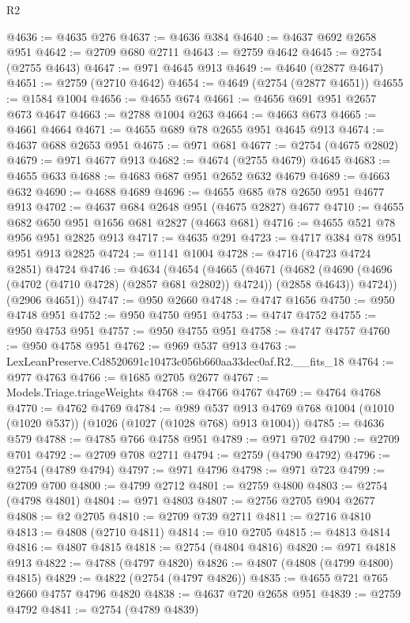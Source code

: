 \begin{lexlean}{R2}
\begin{coremodule}
@4636 := @4635 @276
@4637 := @4636 @384
@4640 := @4637 @692 @2658 @951
@4642 := @2709 @680 @2711
@4643 := @2759 @4642
@4645 := @2754 (@2755 @4643)
@4647 := @971 @4645 @913
@4649 := @4640 (@2877 @4647)
@4651 := @2759 (@2710 @4642)
@4654 := @4649 (@2754 (@2877 @4651))
@4655 := @1584 @1004
@4656 := @4655 @674
@4661 := @4656 @691 @951 @2657 @673 @4647
@4663 := @2788 @1004 @263
@4664 := @4663 @673
@4665 := @4661 @4664
@4671 := @4655 @689 @78 @2655 @951 @4645 @913
@4674 := @4637 @688 @2653 @951
@4675 := @971 @681
@4677 := @2754 (@4675 @2802)
@4679 := @971 @4677 @913
@4682 := @4674 (@2755 @4679) @4645
@4683 := @4655 @633
@4688 := @4683 @687 @951 @2652 @632 @4679
@4689 := @4663 @632
@4690 := @4688 @4689
@4696 := @4655 @685 @78 @2650 @951 @4677 @913
@4702 := @4637 @684 @2648 @951 (@4675 @2827) @4677
@4710 := @4655 @682 @650 @951 @1656 @681 @2827 (@4663 @681)
@4716 := @4655 @521 @78 @956 @951 @2825 @913
@4717 := @4635 @291
@4723 := @4717 @384 @78 @951 @951 @913 @2825
@4724 := @1141 @1004
@4728 := @4716 (@4723 @4724 @2851) @4724
@4746 := @4634
    (@4654
      (@4665
        (@4671
          (@4682 (@4690 (@4696 (@4702 (@4710 @4728) (@2857 @681 @2802)) @4724)) (@2858 @4643))
          @4724))
      (@2906 @4651))
@4747 := @950 @2660
@4748 := @4747 @1656
@4750 := @950 @4748 @951
@4752 := @950 @4750 @951
@4753 := @4747 @4752
@4755 := @950 @4753 @951
@4757 := @950 @4755 @951
@4758 := @4747 @4757
@4760 := @950 @4758 @951
@4762 := @969 @537 @913
@4763 := LexLeanPreserve.Cd8520691c10473c056b660aa33dec0af.R2.__fits_18
@4764 := @977 @4763
@4766 := @1685 @2705 @2677
@4767 := Models.Triage.triageWeights
@4768 := @4766 @4767
@4769 := @4764 @4768
@4770 := @4762 @4769
@4784 := @989
    @537
    @913
    @4769
    @768
    @1004
    (@1010 (@1020 @537))
    (@1026 (@1027 (@1028 @768) @913 @1004))
@4785 := @4636 @579
@4788 := @4785 @766 @4758 @951
@4789 := @971 @702
@4790 := @2709 @701
@4792 := @2709 @708 @2711
@4794 := @2759 (@4790 @4792)
@4796 := @2754 (@4789 @4794)
@4797 := @971 @4796
@4798 := @971 @723
@4799 := @2709 @700
@4800 := @4799 @2712
@4801 := @2759 @4800
@4803 := @2754 (@4798 @4801)
@4804 := @971 @4803
@4807 := @2756 @2705 @904 @2677
@4808 := @2 @2705
@4810 := @2709 @739 @2711
@4811 := @2716 @4810
@4813 := @4808 (@2710 @4811)
@4814 := @10 @2705
@4815 := @4813 @4814
@4816 := @4807 @4815
@4818 := @2754 (@4804 @4816)
@4820 := @971 @4818 @913
@4822 := @4788 (@4797 @4820)
@4826 := @4807 (@4808 (@4799 @4800) @4815)
@4829 := @4822 (@2754 (@4797 @4826))
@4835 := @4655 @721 @765 @2660 @4757 @4796 @4820
@4838 := @4637 @720 @2658 @951
@4839 := @2759 @4792
@4841 := @2754 (@4789 @4839)

\end{coremodule}
\end{lexlean}
